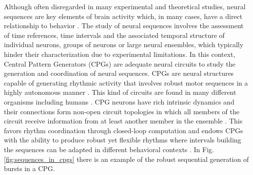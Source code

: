 Although often disregarded in many experimental and theoretical studies, neural sequences are key elements of brain activity which, in many cases, have a direct relationship to behavior \cite{hahnloser_ultra-sparse_2002,venaille_synchronization_2005,hb10,buzsaki_space_2018,rabinovich_discrete_2018,paton_neural_2018,elices_robust_2019}.
The study of neural sequences involves the assessment of time references, time intervals and the associated temporal structure of individual neurons, groups of neurons or large neural ensembles, which typically hinder their characterization due to experimental limitations. In this context, Central Pattern Generators (CPGs) are adequate neural circuits to study the generation and coordination of neural sequences. 
CPGs are neural structures capable of generating rhythmic activity that involves robust motor sequences in a highly autonomous manner \cite{hartline_mottor_1976,selverston_reliable_2000,marder_central_2001}. This kind of circuits are found in many different organisms including humans \cite{dimitrijevic_evidence_1998,pavlidis_neonatal_2016, arichi_localization_2017}. CPG neurons have rich intrinsic dynamics and their connections form non-open circuit topologies in which all members of the circuit receive information from at least another member in the ensemble \cite{selverston_reliable_2000,huerta_topology_2001}. This favors rhythm coordination through closed-loop computation and endows CPGs with the ability to produce robust yet flexible rhythms where intervals building the sequences can be adapted in different behavioral contexts \cite{elices_robust_2019}. %
In Fig. \ref{fig:sequences_in_cpgs} there is an example of the robust sequential generation of bursts in a CPG. 

